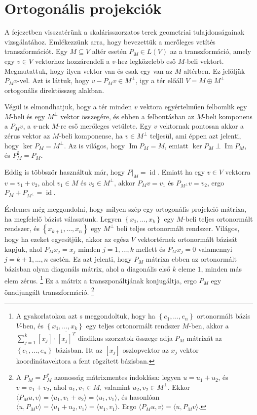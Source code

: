 \documentclass[a4paper, showtrims]{memoir}
\theoremstyle{plain}
\theoremstyle{remark}
\theoremstyle{definition}
\DeclareMathOperator{\id}{id}
\DeclareMathOperator{\im}{Im}
\newcommand{\ip}[2]{\langle#1,#2\rangle}
\begin{document}
\chapter{Ortogonális projekciók}
A fejezetben visszatérünk a skalárisszorzatos terek geometriai tulajdonságainak vizsgálatához.
Emlékezzünk arra, hogy bevezettük a merőleges vetítés transzformációt.
Egy $M\subseteq V$ altér esetén $P_M\in L\left( V \right)$ az a transzformáció, amely egy $v\in V$ vektorhoz hozzárendeli a $v$-hez legközelebb eső $M$-beli vektort.
Megmutattuk, hogy ilyen vektor van és csak egy van az $M$ altérben.
Ez jelöljük $P_Mv$-vel.
Azt is láttuk, hogy $v-P_Mv\in M^\perp$, igy a tér előáll 
$V=M\oplus M^\perp$ ortogonális direktösszeg alakban.

Végül is elmondhatjuk, hogy a tér minden $v$ vektora egyértelműen felbomlik egy $M$-beli és egy $M^\perp$ vektor összegére,
és ebben a felbontásban az $M$-beli komponens a $P_Mv$, a $v$-nek
$M$-re eső merőleges vetülete.
Egy $v$ vektornak pontosan akkor a zérus vektor az $M$-beli komponense, ha $v\in M^\perp$ teljesül, 
ami éppen azt jelenti, hogy $\ker P_M=M^\perp$.
Az is világos, hogy $\im P_M=M$, 
emiatt $\ker P_M\perp\im P_M$, és $P_M^2=P_M$.

Eddig is többször használtuk már, hogy $P|_M=\id$.
Emiatt ha egy $v\in V$ vektorra $v=v_1+v_2$, ahol $v_1\in M$ és $v_2\in M^\perp$, akkor $P_Mv=v_1$ és $P_{M^\perp}v=v_2$, ergo $P_M+P_{M^\perp}=\id$.

Érdemes még meggondolni, hogy milyen szép egy ortogonális projekció mátrixa, ha megfelelő bázist választunk.
Legyen $\left\{ x_1,\ldots,x_k \right\}$ egy $M$-beli teljes ortonormált rendszer, és $\left\{ x_{k+1},\ldots,x_{n} \right\}$ egy $M^\perp$ beli teljes ortonormált rendszer.
Világos, hogy ha ezeket egyesítjük, akkor az egész $V$ vektortérnek ortonormált bázisát kapjuk, ahol $P_Mx_j=x_j$ minden $j=1,\ldots,k$ mellett és $P_{M}x_j=0$ valamennyi $j=k+1,\ldots,n$ esetén.
Ez azt jelenti, hogy $P_M$ mátrixa ebben az ortonormált bázisban olyan diagonáls mátrix, ahol a diagonális első $k$ eleme $1$, minden más elem zérus.
\footnote{A gyakorlatokon azt s meggondoltuk, hogy ha $\left\{ e_1,\ldots,e_n \right\}$ ortonormált bázis $V$-ben, és $\left\{ x_1,\ldots,x_k \right\}$ egy teljes ortonormált rendszer $M$-ben,
akkor a $\sum_{j=1}^k[x_j]\cdot\overline{[x_j]^T}$ diadikus szorzatok összege adja $P_M$ mátrixát az $\left\{ e_1,\ldots,e_n \right\}$ bázisban. 
Itt az $[x_j]$ oszlopvektor az $x_j$ vektor koordinátavektora a fent rögzített bázisban.}
Ez a mátrix a transzponáltjának konjugáltja, ergo $P_M$ egy önadjungált transzformáció.
\footnote{
    A $P_M=P_M^\ast$ azonosság mátrixmentes indoklása: 
    legyen $u=u_1+u_2$, és $v=v_1+v_2$,
    ahol $u_1,v_1\in M$, valamint $u_2,v_2\in M^\perp$.
    Ekkor 
    $
    \ip{P_Mu}{v}=
    \ip{u_1}{v_1+v_2}
    =
    \ip{u_1}{v_1}
    $,
    és hasonlóan
    $
    \ip{u}{P_Mv}
    =
    \ip{u_1+u_2}{v_1}
    =
    \ip{u_1}{v_1}
    $.
    Ergo 
    $
    \ip{P_Mu}{v}
    =
    \ip{u}{P_Mv}.
    $
}
\end{document}
